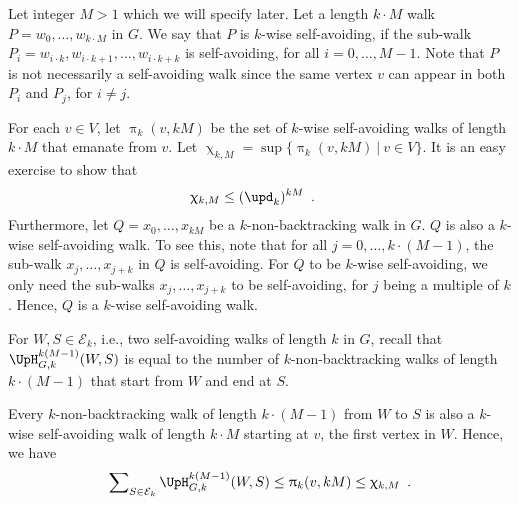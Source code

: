 \documentclass[11pt,reqno]{amsart}
\numberwithin{equation}{section}
\newcommand{\cE}{{\mathcal{E}}}
\newcommand{\amethyst}[1]{{\color{amethyst}#1} }
\newcommand{\blue}[1]{{\color{blue}#1}}
\newcommand{\bluepigment}[1]{{\color{blue(pigment)}#1}}
\newcommand{\capri}[1]{{\color{capri}#1}}
\newcommand{\cadmiumgreen}[1]{{\color{cadmiumgreen}#1}}
\newcommand{\cadmiumorange}[1]{{\color{cadmiumorange}#1}}
\newcommand{\coquelicot}[1]{{\color{coquelicot}#1}}
\newcommand{\electricviolet}[1]{{\color{electricviolet}#1}}
\newcommand{\goldenbrown}[1]{{\color{goldenbrown}#1}}
\newcommand{\heliotrope}[1]{{\color{heliotrope}#1}}
\newcommand{\iris}[1]{{\color{iris}#1}}
\newcommand{\ExtV}{\iris{\cE}}
\newcommand{\cconnective}{\goldenbrown{\upd}}
\newcommand{\NBMatrix}{\cadmiumgreen{\UpH}_{G,\kk}}
\renewcommand{\amethyst}[1]{#1}
\renewcommand{\blue}[1]{#1}
\renewcommand{\bluepigment}[1]{#1}
\renewcommand{\capri}[1]{#1}
\renewcommand{\cadmiumgreen}[1]{#1}
\renewcommand{\cadmiumorange}[1]{#1}
\renewcommand{\coquelicot}[1]{#1}
\renewcommand{\electricviolet}[1]{#1}
\renewcommand{\goldenbrown}[1]{#1}
\renewcommand{\heliotrope}[1]{#1}
\renewcommand{\iris}[1]{#1}
\newcommand{\ki}{\capri{i}}
\newcommand{\kj}{\coquelicot{j}}
\newcommand{\kk}{\bluepigment{k}}
\newcommand{\kM}{\cadmiumorange{M}}
\newcommand{\kP}{\goldenbrown{P}}
\newcommand{\kQ}{\amethyst{Q}}
\newcommand{\kv}{\electricviolet{v}}
\newcommand{\kW}{\blue{W}}
\newcommand{\kw}{\blue{w}}
\newcommand{\kx}{\heliotrope{x}}
\renewcommand{\ki}{i}
\renewcommand{\kj}{j}
\renewcommand{\kk}{k}
\renewcommand{\kM}{M}
\renewcommand{\kP}{P}
\renewcommand{\kQ}{Q}
\renewcommand{\kv}{v}
\renewcommand{\kW}{W}
\renewcommand{\kw}{w}
\renewcommand{\kx}{x}
\begin{document}
%
%

Let integer $\kM>1$ which we will specify later. Let a length $\kk \cdot \kM$ walk 
$\kP=\kw_0, \ldots, \kw_{\kk \cdot \kM}$  in $G$.  We say that $\kP$ is $\kk$-wise self-avoiding, 
if the sub-walk $\kP_{\ki}=\kw_{\ki\cdot \kk}, w_{\ki\cdot \kk+1}, \ldots, w_{\ki\cdot \kk+\kk}$ is 
self-avoiding, for all $\ki=0,\ldots, \kM-1$. Note that $\kP$ is not necessarily a self-avoiding walk 
since the same vertex $\kv$ can appear in both $\kP_{\ki}$ and $\kP_{\kj}$, for $\ki\neq \kj$. 



For each $\kv\in V$, let $\uppi_{\kk}(\kv, \kk \kM)$ be the set of $\kk$-wise self-avoiding walks of length 
$\kk \cdot \kM$ that emanate from $\kv$.  Let $\upchi_{\kk,\kM}=\sup\{ \uppi_{\kk}(\kv, \kk \kM)\ |\ \kv\in V\}$. 
It is an easy exercise to show that 
%
%
\begin{align}
\upchi_{\kk, \kM} & \leq (\cconnective_{\kk})^{\kk \kM}\enspace. 
\end{align}
Furthermore, let $\kQ=x_{0}, \ldots, x_{\kk \kM}$ be a $\kk$-non-backtracking walk in $G$.  $\kQ$ is also a $\kk$-wise 
self-avoiding walk. To see this,  note that for all $\kj=0,\ldots, \kk\cdot(\kM-1)$, the sub-walk $\kx_{\kj},\ldots, \kx_{\kj+\kk}$ 
in $\kQ$ is self-avoiding.   For $\kQ$ to be $\kk$-wise self-avoiding, we only need the sub-walks $\kx_{\kj},\ldots, \kx_{\kj+\kk}$ 
to be self-avoiding, for $\kj$ being a multiple of $\kk$. Hence,  $Q$ is a $\kk$-wise self-avoiding walk. 



For $\kW, S\in \ExtV_{\kk}$, i.e.,  two self-avoiding walks of length $\kk$ in $G$, recall that $\NBMatrix^{\kk (M-1)}(\kW, S)$ is equal to the number of 
$\kk$-non-backtracking walks of length $\kk\cdot (\kM-1)$ that start from $\kW$ and end at $S$. 

Every $\kk$-non-backtracking walk of length $\kk\cdot (\kM-1)$ from $\kW$ to $S$ is also a $\kk$-wise self-avoiding 
walk of length $\kk\cdot \kM$ starting at $\kv$,  the first vertex in $\kW$. Hence, we have 
% 
\begin{align}
\sum\nolimits _{S\in \ExtV_{\kk}}\NBMatrix^{\kk(\kM-1)}(\kW, S) \leq \uppi_{\kk}(\kv, \kk \kM) \leq \upchi_{\kk, \kM} \enspace.
\end{align}
%
\end{document}
